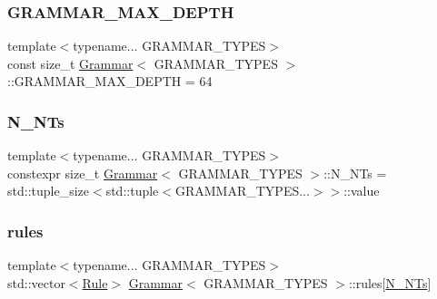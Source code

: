 \subsubsection{\texorpdfstring{G\+R\+A\+M\+M\+A\+R\+\_\+\+M\+A\+X\+\_\+\+D\+E\+P\+TH}{GRAMMAR\_MAX\_DEPTH}}
{\footnotesize\ttfamily template$<$typename... G\+R\+A\+M\+M\+A\+R\+\_\+\+T\+Y\+P\+ES$>$ \\
const size\+\_\+t \hyperlink{class_grammar}{Grammar}$<$ G\+R\+A\+M\+M\+A\+R\+\_\+\+T\+Y\+P\+ES $>$\+::G\+R\+A\+M\+M\+A\+R\+\_\+\+M\+A\+X\+\_\+\+D\+E\+P\+TH = 64\hspace{0.3cm}{\ttfamily [static]}}

\mbox{\label{class_grammar_a45877d4d7a5ee98bf6753af593d6ca08}} 
\subsubsection{\texorpdfstring{N\+\_\+\+N\+Ts}{N\_NTs}}
{\footnotesize\ttfamily template$<$typename... G\+R\+A\+M\+M\+A\+R\+\_\+\+T\+Y\+P\+ES$>$ \\
constexpr size\+\_\+t \hyperlink{class_grammar}{Grammar}$<$ G\+R\+A\+M\+M\+A\+R\+\_\+\+T\+Y\+P\+ES $>$\+::N\+\_\+\+N\+Ts = std\+::tuple\+\_\+size$<$std\+::tuple$<$G\+R\+A\+M\+M\+A\+R\+\_\+\+T\+Y\+P\+E\+S...$>$$>$\+::value\hspace{0.3cm}{\ttfamily [static]}}

\mbox{\label{class_grammar_a8a89ced0753d72f52ccf2b04c0ccc82b}} 
\subsubsection{\texorpdfstring{rules}{rules}}
{\footnotesize\ttfamily template$<$typename... G\+R\+A\+M\+M\+A\+R\+\_\+\+T\+Y\+P\+ES$>$ \\
std\+::vector$<$\hyperlink{class_rule}{Rule}$>$ \hyperlink{class_grammar}{Grammar}$<$ G\+R\+A\+M\+M\+A\+R\+\_\+\+T\+Y\+P\+ES $>$\+::rules\mbox{[}\hyperlink{class_grammar_a45877d4d7a5ee98bf6753af593d6ca08}{N\+\_\+\+N\+Ts}\mbox{]}}

\mbox{\label{class_grammar_a63420ee4232c46523a46bd881cb3e2f5}} 
